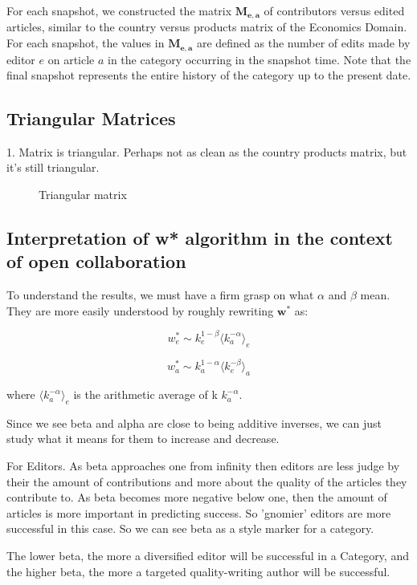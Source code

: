 \documentclass{acm_proc_article-sp}
\begin{document}
For each snapshot, we constructed the matrix $\mathbf{M_{e,a}}$ of contributors versus edited articles, similar to the country versus products matrix of the Economics Domain. For each snapshot, the values in $\mathbf{M_{e,a}}$ are defined as the number of edits made by editor $e$ on article $a$ in the category occurring in the snapshot time. Note that the final snapshot represents the entire history of the category up to the present date. 

\subsection{Triangular Matrices}
1. Matrix is triangular.
Perhaps not as clean as the country products matrix, but it's still triangular.

\begin{figure}[!t]
\centering
\caption{Triangular matrix}
\label{fig:triangle_matrix}
\end{figure}

\subsection{Interpretation of w* algorithm in the context of open collaboration}

To understand the results, we must have a firm grasp on what $\alpha$ and $\beta$ mean. They are more easily understood by roughly rewriting $\mathbf{w^*}$ as:

$$w^{*}_{e} \sim k^{1-\beta}_{e} \langle k_{a}^{-\alpha}\rangle_e $$


$$w^{*}_{a} \sim k^{1-\alpha}_{a} \langle k_{e}^{-\beta}\rangle_a $$

where $\langle k_{a}^{-\alpha}\rangle_e$ is the arithmetic average of k  $k_{a}^{-\alpha}$. 

Since we see beta and alpha are close to being additive inverses, we can just study what it means for them to increase and decrease.

For Editors.
As beta approaches one from infinity then editors are less judge by their the amount of contributions and more about the quality of the articles they contribute to. As beta becomes more negative below one, then the amount of articles is more important in predicting success.  So 'gnomier' editors are more successful in this case. So we can see beta as a style marker for a category.

The lower beta, the more a diversified editor will be successful in a Category, and the higher beta, the more a targeted quality-writing author will be successful.
\end{document}

